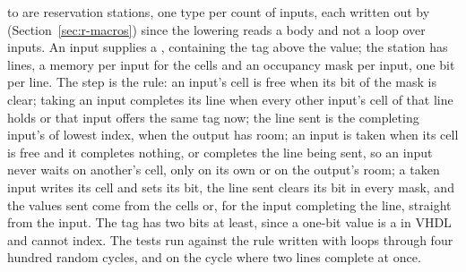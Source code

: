 

 to  are reservation stations, one
type per count of inputs, each written out by 
(Section~\ref{sec:r-macros}) since the lowering reads a body and not
a loop over inputs. An input supplies a , containing the tag
above the value; the station has  lines, a memory
per input for the cells and an occupancy mask per input, one bit per
line. The step is the rule: an input's cell is free when its bit of
the mask is clear; taking an input completes its line when every
other input's cell of that line holds or that input offers the same
tag now; the line sent is the completing input's of lowest index,
when the output has room; an input is taken when its cell is free
and it completes nothing, or completes the line being sent, so an
input never waits on another's cell, only on its own or on the
output's room; a taken input writes its cell and sets its bit, the
line sent clears its bit in every mask, and the values sent come
from the cells or, for the input completing the line, straight from
the input. The tag has two bits at least, since a one-bit value is a
 in VHDL and cannot index. The tests run
 against the rule written with loops through four
hundred random cycles, and  on the cycle where two
lines complete at once.


